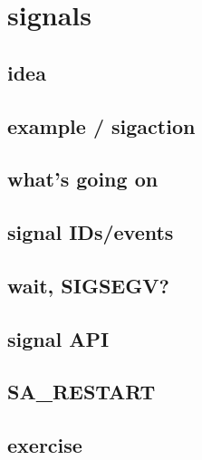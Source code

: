 \section{signals}

\subsection{idea}



\subsection{example / sigaction}



\subsection{what's going on}




\subsection{signal IDs/events}




\subsection{wait, SIGSEGV?}



\subsection{signal API}



\subsection{SA\_RESTART}



\subsection{exercise}


